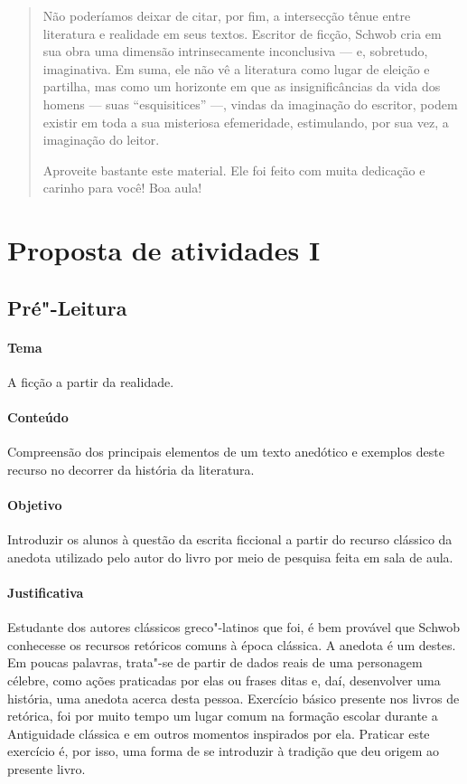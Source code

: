 \documentclass[12pt]{extarticle}
\begin{document}
\begin{abstract}
Não poderíamos deixar de citar, por fim, a intersecção tênue entre literatura 
e realidade em seus textos. Escritor de ficção, Schwob cria em sua obra uma 
dimensão intrinsecamente inconclusiva — e, sobretudo, imaginativa. Em suma, 
ele não vê a literatura como lugar de eleição e partilha, mas como um horizonte 
em que as insignificâncias da vida dos homens — suas ``esquisitices'' —, vindas 
da imaginação do escritor, podem existir em toda a sua misteriosa efemeridade, 
estimulando, por sua vez, a imaginação do leitor.

Aproveite bastante este material. Ele foi feito com muita dedicação e
carinho para você! Boa aula!


\end{abstract}


\tableofcontents

\section{Proposta de atividades I}

\subsection{Pré"-Leitura}

 \paragraph{Tema} A ficção a partir da realidade.

 \paragraph{Conteúdo} Compreensão dos principais elementos de um texto
 anedótico e exemplos deste recurso no decorrer da história da literatura.

 \paragraph{Objetivo} Introduzir os alunos à questão da escrita ficcional a partir
 do recurso clássico da anedota utilizado pelo autor do livro por meio de pesquisa
 feita em sala de aula.

 \paragraph{Justificativa} Estudante dos autores clássicos greco"-latinos que foi,
 é bem provável que Schwob conhecesse os recursos retóricos comuns à época clássica.
 A anedota é um destes. Em poucas palavras, trata"-se de partir de dados reais de 
 uma personagem célebre, como ações praticadas por elas ou frases ditas e, daí, 
 desenvolver uma história, uma anedota acerca desta pessoa. Exercício básico
 presente nos livros de retórica, foi por muito tempo um lugar comum 
 na formação escolar durante a Antiguidade clássica e em outros momentos inspirados por ela. 
 Praticar este exercício é, por isso, uma forma de se introduzir à tradição que deu origem ao
 presente livro.
\end{document}

